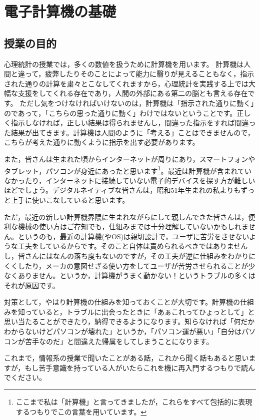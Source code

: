 \documentclass{ltjsbook}
\begin{document}
\chapter{電子計算機の基礎}
\label{computer}

\section{授業の目的}
心理統計の授業では，多くの数値を扱うために計算機を用います。
計算機は人間と違って，疲弊したりそのことによって能力に翳りが見えることもなく，指示された通りの計算を粛々とこなしてくれますから，心理統計を実践する上では大幅な支援をしてくれる存在であり，人間の外部にある第二の脳とも言える存在です。
ただし気をつけなければいけないのは，計算機は「指示された通りに動く」のであって，「こちらの思った通りに動く」わけではないということです。正しく指示しなければ，正しい結果は得られませんし，間違った指示をすれば間違った結果が出てきます。計算機は人間のように「考える」ことはできませんので，こちらが考えた通りに動くように指示を出す必要があります。

また，皆さんは生まれた頃からインターネットが周りにあり，スマートフォンやタブレット，パソコンが身近にあったと思います\footnote{ここまで私は「計算機」と言ってきましたが，これらをすべて包括的に表現するつもりでこの言葉を用いています。}。最近は計算機が含まれていなかったり，インターネットに接続していない電子的デバイスを探す方が難しいほどでしょう。デジタルネイティブな皆さんは，昭和51年生まれの私よりもずっと上手に使いこなしていると思います。

ただ，最近の新しい計算機界隈に生まれながらにして親しんできた皆さんは，便利な機械の使い方はご存知でも，仕組みまでは十分理解していないかもしれません。というのも，最近の計算機(やOS)は親切設計で，ユーザに苦労をさせないような工夫をしているからです。そのこと自体は責められるべきではありませんし，皆さんにはなんの落ち度もないのですが，その工夫が逆に仕組みをわかりにくくしたり，メーカの意図せざる使い方をしてユーザが苦労させられることが少なくありません。というか，計算機がうまく動かない！というトラブルの多くはそれが原因です。

対策として，やはり計算機の仕組みを知っておくことが大切です。計算機の仕組みを知っていると，トラブルに出会ったときに「あぁこれってひょっとして」と思い当たることができたり，納得できるようになります。知らなければ「何だかわからないけどパソコンが壊れた」というか，「パソコン運が悪い」「自分はパソコンが苦手なのだ」と間違えた帰属をしてしまうことになります。

これまで，情報系の授業で聞いたことがある話，これから聞く話もあると思いますが，もし苦手意識を持っている人がいたらこれを機に再入門するつもりで読んでください。
\end{document}

